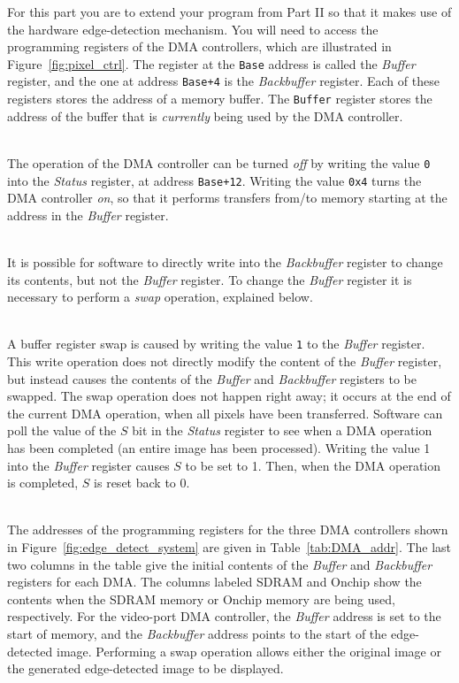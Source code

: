 \documentclass[epsfig,10pt,fullpage]{article}
\begin{document}
For this part you are to extend your program from Part II so that it makes use of the
hardware edge-detection mechanism. You will need to access the programming registers of
the DMA controllers, which are illustrated in Figure~\ref{fig:pixel_ctrl}. 
The register at the \texttt{Base} address is called the {\it Buffer} register, and the one 
at address \texttt{Base+4} is the {\it Backbuffer} register. Each of these registers stores 
the address of a memory buffer.  The \texttt{Buffer} register stores the address of the
buffer that is {\it currently} being used by the DMA controller.

~\\
\noindent
The operation of the DMA controller can be turned {\it off} by writing the value \texttt{0} 
into the {\it Status} register, at address \texttt{Base+12}. Writing the value \texttt{0x4} 
turns the DMA controller {\it on}, so that it performs transfers from/to memory starting at 
the address in the {\it Buffer} register.

~\\
\noindent
It is possible for software to directly write into the {\it Backbuffer} register to change 
its contents, but not the {\it Buffer} register. To change the {\it Buffer} register it is 
necessary to perform a {\it swap} operation, explained below.

~\\
\noindent
A buffer register swap is caused by writing the value \texttt{1} to the {\it Buffer}
register. This write operation does not directly modify the content of 
the {\it Buffer} register, but instead causes the contents of the {\it Buffer} 
and {\it Backbuffer} registers to be swapped. The swap operation does not happen right away;
it occurs at the end of the current DMA operation, when all pixels have been transferred.
Software can poll the value of the $S$ bit in the {\it Status} register to see when a DMA
operation has been completed (an entire image has been processed). Writing the value 1 into 
the {\it Buffer} register causes $S$ to be set to 1. Then, when the DMA operation is 
completed, $S$ is reset back to 0.

~\\
\noindent
The addresses of the programming registers for the three DMA controllers shown in 
Figure~\ref{fig:edge_detect_system} are given in Table~\ref{tab:DMA_addr}. The last two
columns in the table give the initial contents of 
the {\it Buffer} and {\it Backbuffer} registers for
each DMA. The columns labeled SDRAM and Onchip show the contents when the SDRAM memory or
Onchip memory are being used, respectively.  For the video-port DMA controller,
the {\it Buffer} address is set to the start of memory, and the {\it Backbuffer} address 
points to the start of the edge-detected image. Performing a swap operation allows either
the original image or the generated edge-detected image to be displayed.
\end{document}
